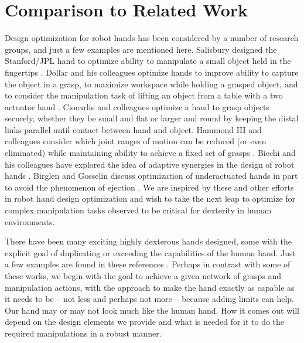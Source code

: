 \section{Comparison to Related Work}

Design optimization for robot hands has been considered by a number of research groups, and just a few examples are mentioned here.   Salisbury  designed the Stanford/JPL hand to optimize ability to manipulate a small object held in the fingertips \cite{salisbury1982articulated}.  Dollar and his colleagues optimize hands to improve ability to capture the object in a grasp, to maximize workspace while holding a grasped object, and to consider the manipulation task of lifting an object from a table with a two actuator hand \cite{borrasDollar2015,ma2014linkage,odhner2015stable}.     Ciocarlie and colleagues optimize a hand to grasp objects securely, whether they be small and flat or larger and round by keeping the distal links parallel until contact between hand and object\cite{ciocarlie2014velo}.    Hammond III and colleagues consider which joint ranges of motion can be reduced (or even eliminated) while maintaining ability to achieve a fixed set of grasps \cite{hammond2012towards}.   Bicchi and his colleagues have explored the idea of adaptive synergies in the design of robot hands \cite{catalano2014adaptive}.   Birglen and Gosselin discuss optimization of underactuated hands in part to avoid the phenomenon of ejection \cite{birglen2006geometric}.    We are inspired by these and other efforts in robot hand design optimization and wish to take the next leap to optimize for complex manipulation tasks observed to be critical for dexterity in human environments.

There have been many exciting highly dexterous hands designed, some with the explicit goal of duplicating or exceeding the capabilities of the human hand.   Just a few examples are found in these references \cite{jacobsen1986design,vande2004act,ShadowHand,mouri2002anthropomorphic,lovchik1999robonaut,grebenstein2011dlr,xudesign}.    Perhaps in contrast with some of these works, we begin with the goal to achieve a given network of grasps and manipulation actions, with the approach to make the hand exactly as capable as it needs to be -- not less and perhaps not more -- because adding limits can help.   Our hand may or may not look much like the human hand.   How it comes out will depend on the design elements we provide and what is needed for it to do the required manipulations in a robust manner.

